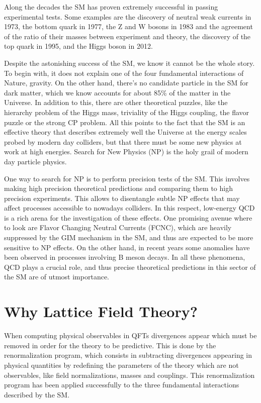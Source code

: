 Along the decades the SM has proven extremely successful in passing experimental tests. Some examples are the discovery of neutral weak currents in 1973, the bottom quark in 1977, the Z and W bosons in 1983 and the agreement of the ratio of their masses between experiment and theory, the discovery of the top quark in 1995, and the Higgs boson in 2012. 

Despite the astonishing success of the SM, we know it cannot be the whole story. To begin with, it does not explain one of the four fundamental interactions of Nature, gravity. On the other hand, there's no candidate particle in the SM for dark matter, which we know accounts for about 85\% of the matter in the Universe. In addition to this, there are other theoretical puzzles, like the hierarchy problem of the Higgs mass, triviality of the Higgs coupling, the flavor puzzle or the strong CP problem. All this points to the fact that the SM is an effective theory that describes extremely well the Universe at the energy scales probed by modern day colliders, but that there must be some new physics at work at high energies. Search for New Physics (NP) is the holy grail of modern day particle physics. 

One way to search for NP is to perform precision tests of the SM. This involves making high precision theoretical predictions and comparing them to high precision experiments. This allows to disentangle subtle NP effects that may affect processes accessible to nowadays colliders. In this respect, low-energy QCD is a rich arena for the investigation of these effects. One promising avenue where to look are Flavor Changing Neutral Currents (FCNC), which are heavily suppressed by the GIM mechanism in the SM, and thus are expected to be more sensitive to NP effects. On the other hand, in recent years some anomalies have been observed in processes involving B meson decays. In all these phenomena, QCD plays a crucial role, and thus precise theoretical predictions in this sector of the SM are of utmost importance.

\section*{Why Lattice Field Theory?}

When computing physical observables in QFTs divergences appear which must be removed in order for the theory to be predictive. This is done by the renormalization program, which consists in subtracting divergences appearing in physical quantities by redefining the parameters of the theory which are not observables, like field normalizations, masses and couplings. This renormalization program has been applied successfully to the three fundamental interactions described by the SM.

